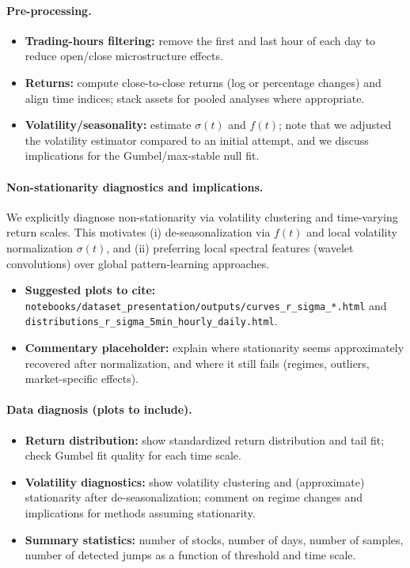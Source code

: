 \documentclass[11pt]{article}
\begin{document}
\paragraph{Pre-processing.}
\begin{itemize}
    \item \textbf{Trading-hours filtering:} remove the first and last hour of each day to reduce open/close microstructure effects. 
    \item \textbf{Returns:} compute close-to-close returns (log or percentage changes) and align time indices; stack assets for pooled analyses where appropriate. 
    \item \textbf{Volatility/seasonality:} estimate $\sigma(t)$ and $f(t)$; note that we adjusted the volatility estimator compared to an initial attempt, and we discuss implications for the Gumbel/max-stable null fit. 
\end{itemize}

\paragraph{Non-stationarity diagnostics and implications.}
We explicitly diagnose non-stationarity via volatility clustering and time-varying return scales. This motivates (i) de-seasonalization via $f(t)$ and local volatility normalization $\sigma(t)$, and (ii) preferring local spectral features (wavelet convolutions) over global pattern-learning approaches. 
\begin{itemize}
    \item \textbf{Suggested plots to cite:} \texttt{notebooks/dataset\_presentation/outputs/curves\_r\_sigma\_*.html} and \texttt{distributions\_r\_sigma\_5min\_hourly\_daily.html}. 
    \item \textbf{Commentary placeholder:} explain where stationarity seems approximately recovered after normalization, and where it still fails (regimes, outliers, market-specific effects). 
\end{itemize}

\paragraph{Data diagnosis (plots to include).}
\begin{itemize}
    \item \textbf{Return distribution:} show standardized return distribution and tail fit; check Gumbel fit quality for each time scale. 
    \item \textbf{Volatility diagnostics:} show volatility clustering and (approximate) stationarity after de-seasonalization; comment on regime changes and implications for methods assuming stationarity. 
    \item \textbf{Summary statistics:} number of stocks, number of days, number of samples, number of detected jumps as a function of threshold and time scale. 
\end{itemize}
\end{document}
